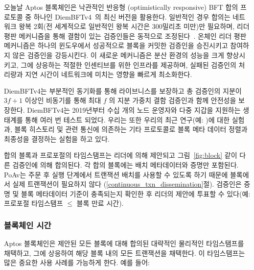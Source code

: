 \documentclass{article}
\begin{document}
오늘날 Aptos 블록체인은 낙관적인 반응형 (optimistically responsive) BFT 합의 프로토콜 중 하나인 DiemBFTv4~\cite{diembft_v4}의 최신 버전을 활용한다. 일반적인 경우 합의는 네트워크 왕복 2회(전 세계적으로 일반적인 왕복 시간은 300밀리초 미만)만 필요하며, 리더 평판 메커니즘을 통해 결함이 있는 검증인들은 동적으로 조정된다~\cite{be_aware}. 온체인 리더 평판 메커니즘은 하나의 윈도우에서 성공적으로 블록을 커밋한 검증인을 승진시키고 참여하지 않은 검증인을 강등시킨다. 이 새로운 메커니즘은 분산 환경의 성능을 크게 향상시키고, 그에 상응하는 적절한 인센티브를 위한 인프라를 제공하며, 실패된 검증인의 처리량과 지연 시간이 네트워크에 미치는 영향을 빠르게 최소화한다.

DiemBFTv4는 부분적인 동기화를 통해 라이브니스를 보장하고 총 검증인의 지분이 $3f +1$ 이상인 비동기를 통해 최대 $f$ 의 지분 가중치 결함 검증인과 함께 안전성을 보장한다. DiemBFTv4는 2019년부터 수십 개의 노드 운영자와 다중 지갑을 지원하는 생태계를 통해 여러 번 테스트 되었다. 우리는 또한 우리의 최근 연구(예: \cite{bullshark})에 대한 실험과, 블록 히스토리 및 관련 통신에 의존하는 기타 프로토콜로 블록 메타 데이터 정렬과 최종성을 결정하는 실험을 하고 있다.

합의 블록과 프로포절의 타임스탬프는 리더에 의해 제안되고 그림~\ref{fig:block} 같이 다른 검증인에 의해 합의된다. 각 합의 블록에는 배치 메타데이터와 증명만 포함된다. PoAv는 주문 후 실행 단계에서 트랜잭션 배치를 사용할 수 있도록 하기 때문에 블록에서 실제 트랜잭션이 필요하지 않다 (\ref{continuous_txn_dissemination}절). 검증인은 증명 및 블록 메타데이터 기준이 충족되는지 확인한 후 리더의 제안에 투표할 수 있다(예: 프로포절 타임스탬프 $\leq$ 블록 만료 시간).

\subsubsection{블록체인 시간}
\label{subsubsec:blockchain_time}

Aptos 블록체인은 제안된 모든 블록에 대해 합의된 대략적인 물리적인 타임스탬프를 채택하고, 그에 상응하여 해당 블록 내의 모든 트랜잭션을 채택한다. 이 타임스탬프는 많은 중요한 사용 사례를 가능하게 한다. 예를 들어:
\end{document}
